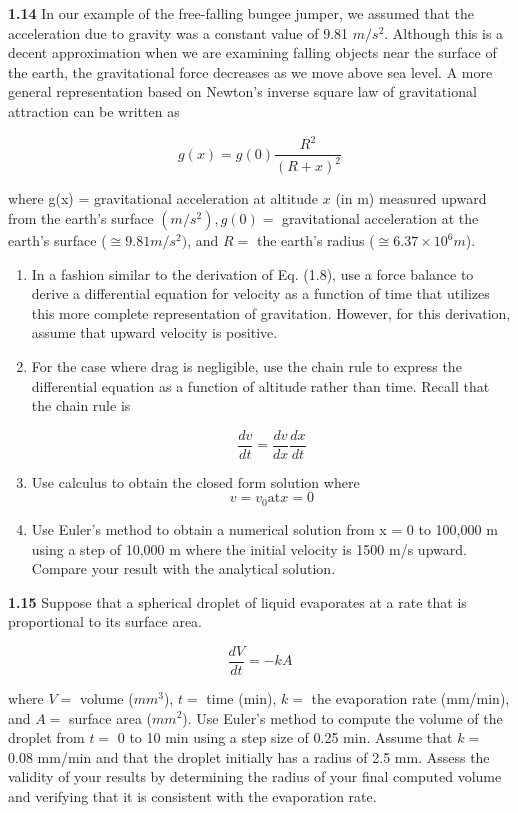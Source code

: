 \documentclass[../main.tex]{subfiles}
\begin{document}
\begin{multicols}{2}
\textbf{1.14} In our example of the free-falling bungee jumper, we
assumed that the acceleration due to gravity was a constant
value of 9.81 $m/s^2$. Although this is a decent approximation
when we are examining falling objects near the surface of
the earth, the gravitational force decreases as we move
above sea level. A more general representation based on
Newton's inverse square law of gravitational attraction can
be written as

$$ g(x)= g(0)\dfrac{R^2}{(R+x)^2}$$

where g(x) = gravitational acceleration at altitude $x$ (in m)
measured upward from the earth's surface $(m/s^2), g(0) =$
gravitational acceleration at the earth's surface ($\cong  9.81 m/s^2)$,
and $R =$ the earth's radius ($\cong  6.37 \times  10^6 m$). 
\begin{enumerate}[label=(\alph*)]
	\item  In a fashion similar to the derivation of Eq. (1.8), use a
	force balance to derive a differential equation for velocity as a function of time that utilizes this more complete
	representation of gravitation. However, for this derivation, assume that upward velocity is positive. 

	\item For the case where drag is negligible, use the chain rule
	to express the differential equation as a function of altitude rather than time. Recall that the chain rule is

	$$\dfrac{dv}{dt} = \dfrac{dv}{dx}\dfrac{dx}{dt} $$

	\item Use calculus to obtain the closed form solution where
	$$ v=v_0 \text{at} x=0 $$
	\item Use Euler's method to obtain a numerical solution from
	x = 0 to 100,000 m using a step of 10,000 m where the
	initial velocity is 1500 m/s upward. Compare your result
	with the analytical solution.


\end{enumerate}

\textbf{1.15} Suppose that a spherical droplet of liquid evaporates at
a rate that is proportional to its surface area.


$$ \dfrac{dV}{dt} = -kA$$

where $V =$ volume ($mm^3$), $t =$ time (min), $k =$ the evaporation rate (mm/min), and $A =$ surface area ($mm^2$). Use
Euler's method to compute the volume of the droplet from
$t =$ 0 to 10 min using a step size of 0.25 min. Assume that
$k =$ 0.08 mm/min and that the droplet initially has a radius of
2.5 mm. Assess the validity of your results by determining
the radius of your final computed volume and verifying that
it is consistent with the evaporation rate. 


\end{multicols}
\end{document}
